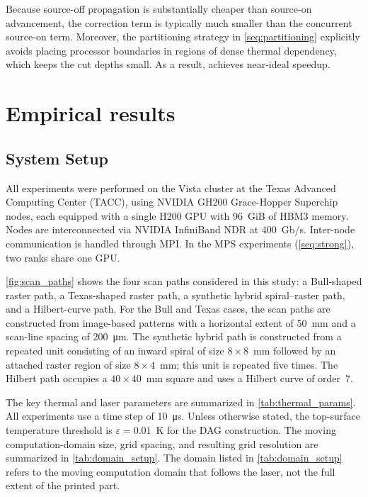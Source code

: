\documentclass[conference]{IEEEtran}
\begin{document}
Because source-off propagation is substantially cheaper than source-on advancement, the correction term is typically much smaller than the concurrent source-on term. Moreover, the partitioning strategy in \cref{seq:partitioning} explicitly avoids placing processor boundaries in regions of dense thermal dependency, which keeps the cut depths small. As a result, \method achieves near-ideal speedup.
\section{Empirical results}\label{seq:results}
\subsection{System Setup}
All experiments were performed on the Vista cluster at the Texas Advanced
Computing Center (TACC), using NVIDIA GH200 Grace-Hopper Superchip nodes,
each equipped with a single H200 GPU with 96~GiB of HBM3 memory.
Nodes are interconnected via NVIDIA InfiniBand NDR at 400~Gb/s.
Inter-node communication is handled through MPI.
In the MPS experiments (\cref{seq:strong}), two ranks share one GPU.

\cref{fig:scan_paths} shows the four scan paths considered in this
study: a Bull-shaped raster path, a Texas-shaped raster path, a synthetic
hybrid spiral--raster path, and a Hilbert-curve path.
For the Bull and Texas cases, the scan paths are constructed from
image-based patterns with a horizontal extent of 50~mm and a scan-line
spacing of 200~\si{\micro\meter}.
The synthetic hybrid path is constructed from a repeated unit consisting of
an inward spiral of size $8\times8$~mm followed by an attached raster region
of size $8\times4$~mm; this unit is repeated five times.
The Hilbert path occupies a $40\times40$~mm square and uses a Hilbert curve
of order~7.

The key thermal and laser parameters are summarized in
\cref{tab:thermal_params}.
All experiments use a time step of 10~\si{\micro\second}.
Unless otherwise stated, the top-surface temperature threshold is
$\varepsilon = 0.01$~K for the DAG construction.
The moving computation-domain size, grid spacing, and resulting grid
resolution are summarized in \cref{tab:domain_setup}.
The domain listed in \cref{tab:domain_setup} refers to the moving
computation domain that follows the laser, not the full extent of the
printed part.
\end{document}
